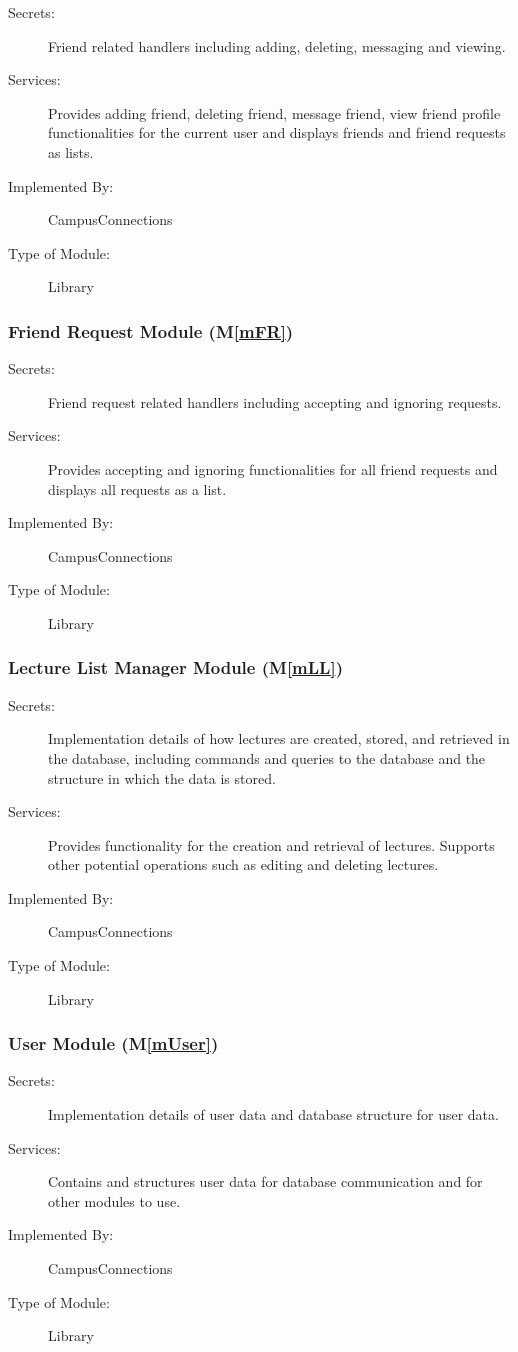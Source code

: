 \documentclass[12pt, titlepage]{article}
\newcommand{\mref}[1]{M\ref{#1}}
\begin{document}
\begin{description}
\item[Secrets:]Friend related handlers including adding, deleting, messaging and viewing.
\item[Services:]Provides adding friend, deleting friend, message friend, view friend profile functionalities for the current user and displays friends and friend requests as lists.
\item[Implemented By:] CampusConnections
\item[Type of Module:] Library
\end{description}

\subsubsection{Friend Request Module (\mref{mFR})}

\begin{description}
\item[Secrets:]Friend request related handlers including accepting and ignoring requests.
\item[Services:]Provides accepting and ignoring functionalities for all friend requests and displays all requests as a list.
\item[Implemented By:] CampusConnections
\item[Type of Module:] Library
\end{description}

\subsubsection{Lecture List Manager Module (\mref{mLL})}

\begin{description}
\item[Secrets:] Implementation details of how lectures are created, stored, and retrieved in the database, including commands and queries to the database and the structure in which the data is stored.
\item[Services:] Provides functionality for the creation and retrieval of lectures. Supports other potential operations such as editing and deleting lectures.
\item[Implemented By:] CampusConnections
\item[Type of Module:] Library
\end{description}

\subsubsection{User Module (\mref{mUser})}
\begin{description}
  \item[Secrets:]Implementation details of user data and database structure for user data.
  \item[Services:]Contains and structures user data for database communication and for other modules to use.
  \item[Implemented By:] CampusConnections
  \item[Type of Module:] Library
  \end{description}
\end{document}
